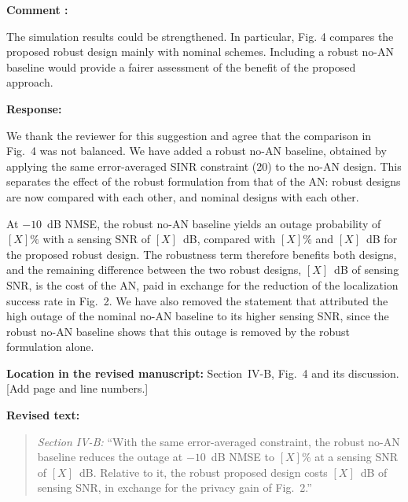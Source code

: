 \documentclass[a4paper,12pt]{article}
\newcounter{reviewcomment}
\newenvironment{reviewcomment}{%
  \stepcounter{reviewcomment}%
  \begin{shaded}
  \textbf{Comment \thereviewcomment:}\par
}{\end{shaded}}
\newenvironment{response}{\par\textbf{Response:}\par}{\par}
\newcommand{\revisionlocation}[1]{\par\textbf{Location in the revised manuscript:} #1\par}
\newenvironment{revisedtext}{%
  \par\textbf{Revised text:}\begin{quote}\color{red}
}{\end{quote}}
\begin{document}
\begin{reviewcomment}
The simulation results could be strengthened. In particular, Fig. 4
compares the proposed robust design mainly with nominal schemes. Including
a robust no-AN baseline would provide a fairer assessment of the benefit of
the proposed approach.
\end{reviewcomment}
\begin{response}
We thank the reviewer for this suggestion and agree that the comparison in
Fig.~4 was not balanced. We have added a robust no-AN baseline, obtained by
applying the same error-averaged SINR constraint (20) to the no-AN design.
This separates the effect of the robust formulation from that of the AN:
robust designs are now compared with each other, and nominal designs with
each other.

At $-10$~dB NMSE, the robust no-AN baseline yields an outage probability of
$[X]\%$ with a sensing SNR of $[X]$~dB, compared with $[X]\%$ and $[X]$~dB
for the proposed robust design. The robustness term therefore benefits both
designs, and the remaining difference between the two robust designs, $[X]$~dB
of sensing SNR, is the cost of the AN, paid in exchange for the reduction of
the localization success rate in Fig.~2. We have also removed the statement
that attributed the high outage of the nominal no-AN baseline to its higher
sensing SNR, since the robust no-AN baseline shows that this outage is
removed by the robust formulation alone.
\end{response}
\revisionlocation{Section~IV-B, Fig.~4 and its discussion. [Add page and
line numbers.]}
\begin{revisedtext}
\textit{Section IV-B:} ``With the same error-averaged constraint, the robust
no-AN baseline reduces the outage at $-10$~dB NMSE to $[X]\%$ at a sensing
SNR of $[X]$~dB. Relative to it, the robust proposed design costs $[X]$~dB of
sensing SNR, in exchange for the privacy gain of Fig.~2.''
\end{revisedtext}
\end{document}
